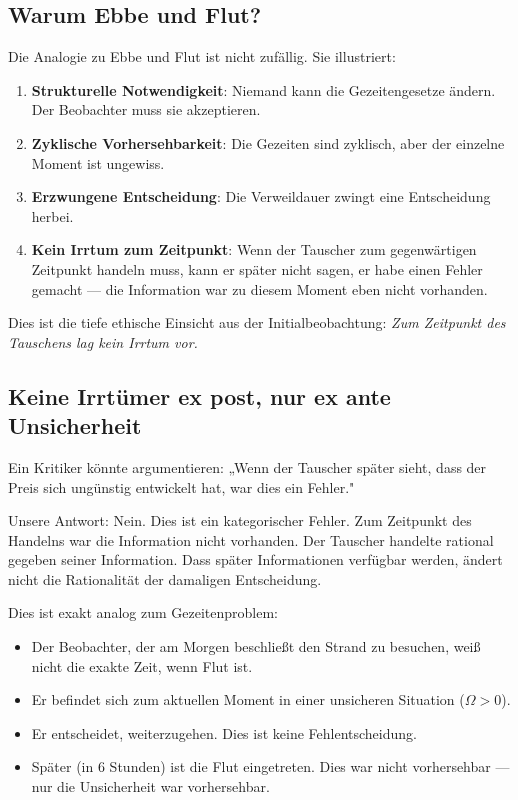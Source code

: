 \documentclass[a4paper, 12pt, twoside, openright]{report}
\theoremstyle{definition}
\theoremstyle{definition}
\begin{document}
\subsection{Warum Ebbe und Flut?}

Die Analogie zu Ebbe und Flut ist nicht zufällig. Sie illustriert:

\begin{enumerate}
    \item \textbf{Strukturelle Notwendigkeit}: Niemand kann die Gezeitengesetze ändern. Der Beobachter muss sie akzeptieren.
    \item \textbf{Zyklische Vorhersehbarkeit}: Die Gezeiten sind zyklisch, aber der einzelne Moment ist ungewiss.
    \item \textbf{Erzwungene Entscheidung}: Die Verweildauer zwingt eine Entscheidung herbei.
    \item \textbf{Kein Irrtum zum Zeitpunkt}: Wenn der Tauscher zum gegenwärtigen Zeitpunkt handeln muss, kann er später nicht sagen, er habe einen Fehler gemacht --- die Information war zu diesem Moment eben nicht vorhanden.
\end{enumerate}

Dies ist die tiefe ethische Einsicht aus der Initialbeobachtung: \emph{Zum Zeitpunkt des Tauschens lag kein Irrtum vor.}

\subsection{Keine Irrtümer ex post, nur ex ante Unsicherheit}

Ein Kritiker könnte argumentieren: „Wenn der Tauscher später sieht, dass der Preis sich ungünstig entwickelt hat, war dies ein Fehler."

Unsere Antwort: Nein. Dies ist ein kategorischer Fehler. Zum Zeitpunkt des Handelns war die Information nicht vorhanden. Der Tauscher handelte rational gegeben seiner Information. Dass später Informationen verfügbar werden, ändert nicht die Rationalität der damaligen Entscheidung.

Dies ist exakt analog zum Gezeitenproblem:
\begin{itemize}
    \item Der Beobachter, der am Morgen beschließt den Strand zu besuchen, weiß nicht die exakte Zeit, wenn Flut ist.
    \item Er befindet sich zum aktuellen Moment in einer unsicheren Situation ($\Omega > 0$).
    \item Er entscheidet, weiterzugehen. Dies ist keine Fehlentscheidung.
    \item Später (in 6 Stunden) ist die Flut eingetreten. Dies war nicht vorhersehbar --- nur die Unsicherheit war vorhersehbar.
\end{itemize}
\end{document}
